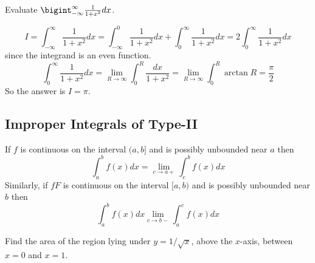 \documentclass[../calc1-main.tex]{subfiles}
\begin{document}
\begin{example}
	Evaluate $\bigint_{-\infty}^{\infty} \frac{1}{1+x^2} dx$.
\end{example}
\begin{minipage}{0.5\textwidth}
\begin{solution}
	\[
		I =
		\int_{-\infty}^{\infty} \frac{1}{1+x^2} dx =
		\int_{-\infty}^0 \frac{1}{1+x^2} dx + \int_0^{\infty} \frac{1}{1+x^2} dx = 2 \int_0^{\infty} \frac{1}{1+x^2} dx
	\]
	since the integrand is an even function.
	\[
		\int_0^{\infty} \frac{1}{1+x^2} dx =
		\lim_{R \to \infty}\int_0^R \frac{dx}{1+x^2} =
		\lim_{R \to \infty}\int_0^R \arctan R =
		\frac{\pi}{2}
	\]
	So the answer is $I = \pi$.
\end{solution}
\end{minipage}%
\begin{minipage}{0.5\textwidth}
  \begin{figure}[H]
  	\centering
  \end{figure}
\end{minipage}


\subsection*{Improper Integrals of Type-II}
\begin{definition}
	If $f$ is continuous on the interval $(a,b]$ and is possibly unbounded near $a$ then
	\[
		\int_a^b f(x) dx = \lim_{c \to a+} \int_c^b f(x) dx
	\]
	Similarly, if $fF$ is continuous on the interval $[a,b)$ and is possibly unbounded near $b$ then
	\[
		\int_a^b f(x) dx \lim_{c \to b-} \int_a^c f(x) dx
	\]
\end{definition}

\begin{example}
	Find the area of the region lying under $y=1/\sqrt{x}$, above the $x$-axis, between $x=0$ and $x=1$.
\end{example}
\end{document}
